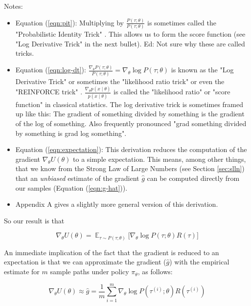 \documentclass[11pt, oneside]{article}                          %
\DeclareMathOperator{\E}{\mathbb{E}}
\begin{document}
\bigskip
\noindent
Notes:
\begin{itemize}
\item Equation (\ref{eqn:pit}): Multiplying by
$\frac{P(\tau;\theta)} {P(\tau;\theta)}$ is sometimes called the
"Probabilistic Identity Trick" \cite{log_derivative_trick}. This
allows us to form the score function (see "Log Derivative Trick"
in the next bullet). Ed: Not sure why these are called tricks.
\item Equation (\ref{eqn:log-dt}): $\frac{\nabla_{\theta}
P(\tau;\theta)}{P(\tau;\theta)} = \nabla_{\theta} \log
P(\tau;\theta)$ is known as the "Log Derivative Trick"
\cite{log_derivative_trick} or sometimes the "likelihood ratio
trick" or even the "REINFORCE trick" \cite{Williams1992} .
$\frac{\nabla_{\theta} p(x \mid \theta)}{p(x \mid \theta)}$ is
called the "likelihood ratio" or "score function" in classical
statistics.  The log derivative trick is sometimes framed up like
this: The gradient of something divided by something is the
gradient of the log of something. Also frequently pronounced
"grad something divided by something is grad log something".
\item Equation (\ref{eqn:expectation}): This derivation reduces the
computation of the gradient $\nabla_{\theta}U(\theta)$ to a
simple expectation.  This means, among other things, that we know
from the Strong Law of Large Numbers (see Section \ref{sec:slln})
that an \emph{unbiased} estimate of the gradient $\hat{g}$ can be
computed directly from our samples (Equation (\ref{eqn:g-hat})).
\item Appendix A gives a slightly more general version of this
derivation.
\end{itemize}

\bigskip
\noindent
So our result is that 

\begin{equation*}
\nabla_{\theta} U(\theta) = \E_{\tau \sim P(\tau;\theta)} 
\Big [\nabla_{\theta} \log P(\tau; \theta) R(\tau) \Big ]
\end{equation*}

\bigskip
\noindent
An immediate implication of the fact that the gradient is reduced
to an expectation is that we can approximate the gradient
($\hat{g}$) with the empirical estimate for $m$ sample paths
under policy $\pi_\theta$,  as follows: 

\begin{equation}
\nabla_\theta U(\theta) \approx \hat{g} = \frac{1}{m}
\sum\limits_{i = 1}^{m} \nabla_{\theta} \log  P(\tau^{(i)} ;
\theta) R(\tau^{(i)}) 
\label{eqn:g-hat}
\end{equation}
\end{document}

